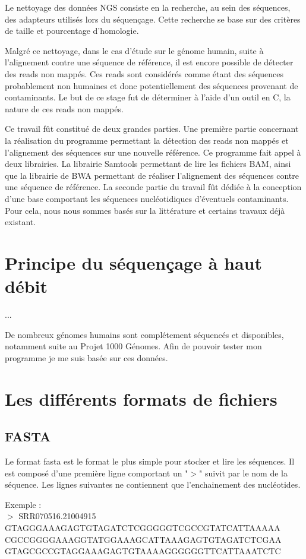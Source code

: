 \documentclass[a4paper,12pt]{article}
\begin{document}
Le nettoyage des données NGS consiste en la recherche, au sein des séquences, des adapteurs  utilisés lors du séquençage. Cette recherche se base sur des critères de taille et pourcentage d'homologie.

Malgré ce nettoyage, dans le cas d'étude sur le génome humain, suite à l'alignement contre une séquence de référence, il est encore possible de détecter des reads non mappés. Ces reads sont considérés comme étant des séquences probablement non humaines et donc potentiellement des séquences provenant de contaminants. Le but de ce stage fut de déterminer à l'aide d'un outil en C, la nature de ces reads non mappés. 

Ce travail fût constitué de deux grandes parties. Une première partie concernant la réalisation du programme permettant la détection des reads non mappés et l'alignement des séquences sur une nouvelle référence. Ce programme fait appel à deux librairies. La librairie Samtools permettant de lire les fichiers BAM, ainsi que la librairie de BWA permettant de réaliser l'alignement des séquences contre une séquence de référence. La seconde partie du travail fût dédiée à la conception d'une base comportant les séquences nucléotidiques d'éventuels contaminants. Pour cela, nous nous sommes basés sur la littérature et certains travaux déjà existant. 


\section{Principe du séquençage à haut débit}
...

De nombreux génomes humains sont complétement séquencés et disponibles, notamment suite au Projet 1000 Génomes. Afin de pouvoir tester mon programme je me suis basée sur ces données. \\
\section{Les différents formats de fichiers}


\subsection{FASTA}
Le format fasta est le format le plus simple pour stocker et lire les séquences. Il est composé d'une première ligne comportant un "$>$" suivit par le nom de la séquence. Les lignes suivantes ne contiennent que l'enchainement des nucléotides. 

Exemple : \\
$>$ SRR070516.21004915 \\
GTAGGGAAAGAGTGTAGATCTCGGGGGTCGCCGTATCATTAAAAA \\
CGCCGGGGAAAGGTATGGAAAGCATTAAAGAGTGTAGATCTCGAA \\
GTAGCGCCGTAGGAAAGAGTGTAAAAGGGGGGTTCATTAAATCTC 
\end{document}
